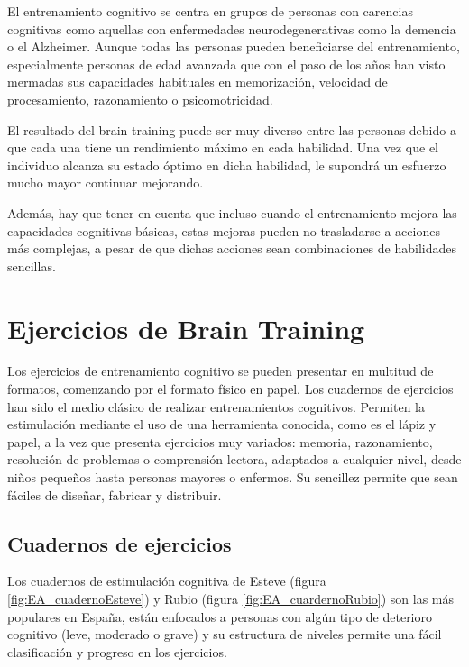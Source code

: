 El entrenamiento cognitivo se centra en grupos de personas con carencias cognitivas como aquellas con enfermedades neurodegenerativas como la demencia o el Alzheimer. Aunque todas las personas pueden beneficiarse del entrenamiento, especialmente personas de edad avanzada que con el paso de los años han visto mermadas sus capacidades habituales en memorización, velocidad de procesamiento, razonamiento o psicomotricidad.

El resultado del brain training puede ser muy diverso entre las personas debido a que cada una tiene un rendimiento máximo en cada habilidad. Una vez que el individuo alcanza su estado óptimo en dicha habilidad, le supondrá un esfuerzo mucho mayor continuar mejorando.

Además, hay que tener en cuenta que incluso cuando el entrenamiento mejora las capacidades cognitivas básicas, estas mejoras pueden no trasladarse a acciones más complejas, a pesar de que dichas acciones sean combinaciones de habilidades sencillas.


\section{Ejercicios de Brain Training}
\label{sec:estadoArte:ejerciciosBrainTraining}

Los ejercicios de entrenamiento cognitivo se pueden presentar en multitud de formatos, comenzando por el formato físico en papel. Los cuadernos de ejercicios han sido el medio clásico de realizar entrenamientos cognitivos. Permiten la estimulación mediante el uso de una herramienta conocida, como es el lápiz y papel, a la vez que presenta ejercicios muy variados: memoria, razonamiento, resolución de problemas o comprensión lectora, adaptados a cualquier nivel, desde niños pequeños hasta personas mayores o enfermos. Su sencillez permite que sean fáciles de diseñar, fabricar y distribuir.

\subsection{Cuadernos de ejercicios}

Los cuadernos de estimulación cognitiva de Esteve (figura \ref{fig:EA_cuadernoEsteve}) y Rubio (figura \ref{fig:EA_cuardernoRubio}) son las más populares en España, están enfocados a personas con algún tipo de deterioro cognitivo (leve, moderado o grave) y su estructura de niveles permite una fácil clasificación y progreso en los ejercicios.






